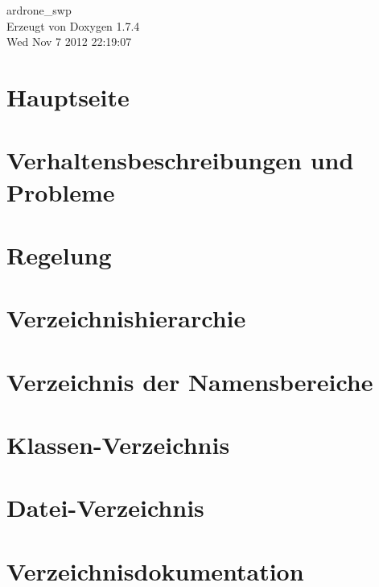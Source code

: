\documentclass[a4paper]{book}
\begin{document}
\hypersetup{pageanchor=false}
\begin{titlepage}
\vspace*{7cm}
\begin{center}
{\Large ardrone\_\-swp }\\
\vspace*{1cm}
{\large Erzeugt von Doxygen 1.7.4}\\
\vspace*{0.5cm}
{\small Wed Nov 7 2012 22:19:07}\\
\end{center}
\end{titlepage}
\clearemptydoublepage
{}
\tableofcontents
\clearemptydoublepage
{}
\hypersetup{pageanchor=true}
\chapter{Hauptseite}
\label{index}\hypertarget{index}{}
\chapter{Verhaltensbeschreibungen und Probleme}
\label{page2}
\hypertarget{page2}{}

\chapter{Regelung}
\label{page1}
\hypertarget{page1}{}

\chapter{Verzeichnishierarchie}

\chapter{Verzeichnis der Namensbereiche}

\chapter{Klassen-\/Verzeichnis}

\chapter{Datei-\/Verzeichnis}

\chapter{Verzeichnisdokumentation}



\end{document}
